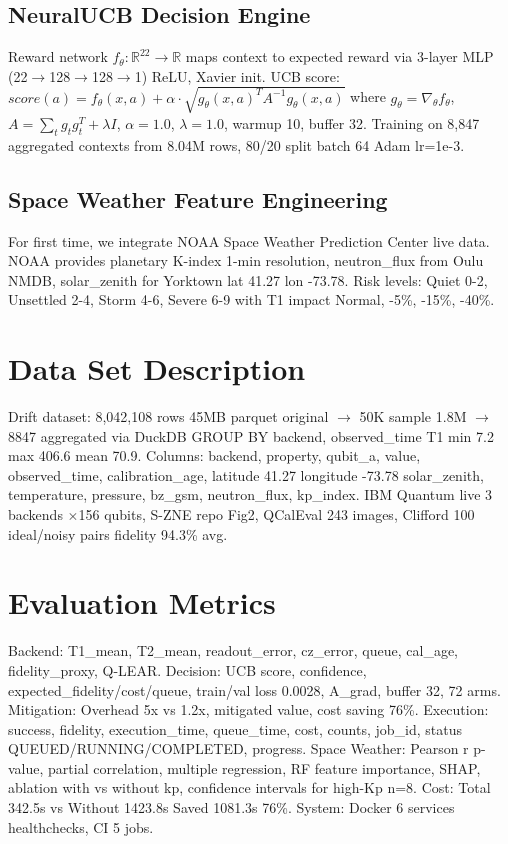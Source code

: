 \documentclass[conference]{IEEEtran}
\begin{document}
\subsection{NeuralUCB Decision Engine}
Reward network $f_\theta: \mathbb{R}^{22} \rightarrow \mathbb{R}$ maps context to expected reward via 3-layer MLP (22$\rightarrow$128$\rightarrow$128$\rightarrow$1) ReLU, Xavier init. UCB score: $score(a) = f_\theta(x,a) + \alpha \cdot \sqrt{g_\theta(x,a)^T A^{-1} g_\theta(x,a)}$ where $g_\theta = \nabla_\theta f_\theta$, $A = \sum_t g_t g_t^T + \lambda I$, $\alpha=1.0$, $\lambda=1.0$, warmup 10, buffer 32. Training on 8,847 aggregated contexts from 8.04M rows, 80/20 split batch 64 Adam lr=1e-3.

\subsection{Space Weather Feature Engineering}
For first time, we integrate NOAA Space Weather Prediction Center live data. NOAA provides planetary K-index 1-min resolution, neutron\_flux from Oulu NMDB, solar\_zenith for Yorktown lat 41.27 lon -73.78. Risk levels: Quiet 0-2, Unsettled 2-4, Storm 4-6, Severe 6-9 with T1 impact Normal, -5\%, -15\%, -40\%.

\section{Data Set Description}
Drift dataset: 8,042,108 rows 45MB parquet original $\rightarrow$ 50K sample 1.8M $\rightarrow$ 8847 aggregated via DuckDB GROUP BY backend, observed\_time T1 min 7.2 max 406.6 mean 70.9. Columns: backend, property, qubit\_a, value, observed\_time, calibration\_age, latitude 41.27 longitude -73.78 solar\_zenith, temperature, pressure, bz\_gsm, neutron\_flux, kp\_index. IBM Quantum live 3 backends $\times$156 qubits, S-ZNE repo Fig2, QCalEval 243 images, Clifford 100 ideal/noisy pairs fidelity 94.3\% avg.

\section{Evaluation Metrics}
Backend: T1\_mean, T2\_mean, readout\_error, cz\_error, queue, cal\_age, fidelity\_proxy, Q-LEAR. Decision: UCB score, confidence, expected\_fidelity/cost/queue, train/val loss 0.0028, A\_grad, buffer 32, 72 arms. Mitigation: Overhead 5x vs 1.2x, mitigated value, cost saving 76\%. Execution: success, fidelity, execution\_time, queue\_time, cost, counts, job\_id, status QUEUED/RUNNING/COMPLETED, progress. Space Weather: Pearson r p-value, partial correlation, multiple regression, RF feature importance, SHAP, ablation with vs without kp, confidence intervals for high-Kp n=8. Cost: Total 342.5s vs Without 1423.8s Saved 1081.3s 76\%. System: Docker 6 services healthchecks, CI 5 jobs.
\end{document}
